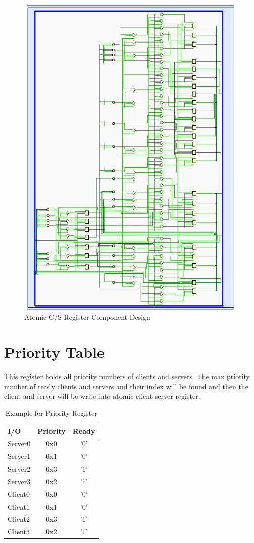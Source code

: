 \begin{figure}[htb]
	\centering
	\includegraphics[width=.8\linewidth]{figures/atomic-reg.png}
	\caption{Atomic C/S Register Component Design}
	\label{fig:csreg}
\end{figure}


\section{Priority Table}

This register holds all priority numbers of clients and servers. The max priority number of ready clients and servers and their index will be found and then the client and server will be write into atomic client server register.
         \begin{table}[htb]
	\centering
	\caption{Example for Priority Register }
	\begin{tabular}{l c c}
		\toprule
		I/O  & Priority  & Ready \\ \midrule
		Server0  &  0x0 & '0'\\
		Server1  &  0x1 & '0'\\
		Server2  &  0x3 & '1'\\
		Server3  &  0x2 & '1'\\
		Client0   &  0x0 & '0'\\
		Client1   &  0x1 & '0'\\
		Client2   &  0x3 & '1'\\
		Client3   &  0x2 & '1'\\	
		\bottomrule
	\end{tabular}
	\label{tab:pri-tab}
\end{table}

